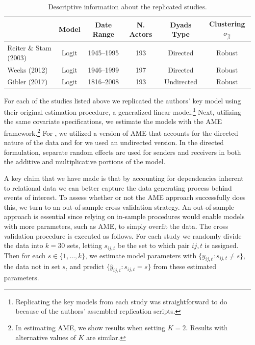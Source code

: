 \begin{table}
\caption{Descriptive information about the replicated studies. }
	\begin{tabular}{lccccc}
		& Model &  Date Range & N. Actors  & Dyads Type & Clustering $\sigma_{\hat{\beta}}$ \\ \toprule
		Reiter \& Stam (2003) & Logit &1945--1995 &  193 & Directed & Robust \\	
		Weeks (2012) & Logit & 1946--1999 & 197 & Directed & Robust \\
		Gibler (2017) & Logit & 1816--2008 & 193 & Undirected & Robust \\ \bottomrule
	\end{tabular}
	\label{tab:modelDesign}
\end{table}

For each of the studies listed above we replicated the authors' key model using their original estimation procedure, a generalized linear model.\footnote{Replicating the key models from each study was straightforward to do because of the authors' assembled replication scripts.} Next, utilizing the same covariate specifications, we estimate the models with the AME framework.\footnote{In estimating AME, we show results when setting $K=2$. Results with alternative values of $K$ are similar.} For \citet{reiter:stam:2003, weeks:2012}, we utilized a version of AME that accounts for the directed nature of the data and for \citet{gibler:2017} we used an undirected version. In the directed formulation, separate random effects are used for senders and receivers in both the additive and multiplicative portions of the model. 

A key claim that we have made is that by accounting for dependencies inherent to relational data we can better capture the data generating process behind events of interest. To assess whether or not the AME approach successfully does this, we turn to an out-of-sample cross validation strategy. An out-of-sample approach is essential since relying on in-sample procedures would enable models with more parameters, such as AME, to simply overfit the data. The cross validation procedure is executed as follows. For each study  we randomly divide the data into $k=30$ sets, letting $s_{ij,t}$ be the set to which pair $ij,t$ is assigned. Then for each $s \in \{1,\ldots,k\}$, we estimate model parameters with $\{y_{ij,t}: s_{ij,t} \neq s\}$, the data not in set $s$, and predict $\{\hat{y}_{ij,t}: s_{ij,t} = s\}$ from these estimated parameters. 

